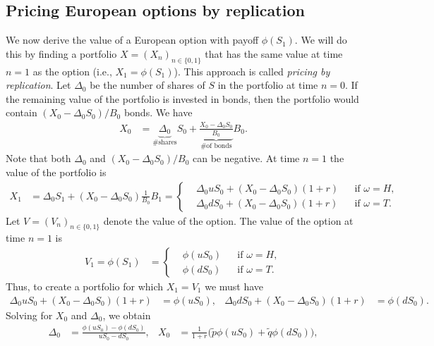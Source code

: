 \documentclass[12pt]{book}
\numberwithin{equation}{chapter}
\theoremstyle{plain}
\numberwithin{theorem}{section}
\theoremstyle{definition}
\numberwithin{exercise}{chapter}
\newcommand{\<}{\langle}
\renewcommand{\>}{\rangle}
\renewcommand{\(}{\left(}
\renewcommand{\)}{\right)}
\renewcommand{\[}{\left[}
\renewcommand{\]}{\right]}
\newcommand\om{\omega}
\newcommand\qt{\widetilde{q}}
\theoremstyle{definition}
\numberwithin{question}{section}
\newcommand\pt{\widetilde{p}}
\begin{document}
\subsection{Pricing European options by replication}
\label{sec:replication}
We now derive the value of a European option with payoff $\phi(S_1)$.
We will do this by finding a portfolio $X = (X_n)_{n \in \{0,1\}}$ that has the same value at time $n=1$ as the option (i.e., $X_1 = \phi(S_1)$). This approach is called \textit{pricing by replication}.
Let $\Delta_0$ be the number of shares of $S$ in the portfolio at time $n=0$. If the remaining value of the portfolio is invested in bonds, then the portfolio would contain $(X_0 - \Delta_0 S_0)/B_0$ bonds.  We have
\begin{align}
X_0
	&= \underbrace{\Delta_0}_{\text{\# shares}} S_0 + \underbrace{\frac{X_0 - \Delta_0 S_0}{B_0}}_{\text{\# of bonds}} B_0.
\end{align}
Note that both $\Delta_0$ and $(X_0 - \Delta_0 S_0)/B_0$ can be negative.
At time $n=1$ the value of the portfolio is
\begin{align}
X_1 
	&= \Delta_0 S_1 + (X_0 - \Delta_0 S_0) \frac{1}{B_0}B_1  =
		\left\{ \begin{aligned}	
			&\Delta_0 u S_0 + (X_0 - \Delta_0 S_0) (1+r) && \text{if $\om = H$}, \\
			&\Delta_0 d S_0 + (X_0 - \Delta_0 S_0) (1+r) && \text{if $\om = T$}.
		\end{aligned} \right.
\end{align}
Let $V = (V_n)_{n \in \{0,1\}}$ denote the value of the option.  The value of the option at time $n=1$ is
\begin{align}
V_1 = \phi(S_1)
	&=
		\left\{ \begin{aligned}	
			&\phi(u S_0) && \text{if $\om = H$}, \\
			&\phi(d S_0) && \text{if $\om = T$}.
		\end{aligned} \right.
\end{align}
Thus, to create a portfolio for which $X_1 = V_1$ we must have
\begin{align} 
\Delta_0 u S_0 + (X_0 - \Delta_0 S_0) (1+r) 
	&=	\phi(u S_0) , &
\Delta_0 d S_0 + (X_0 - \Delta_0 S_0) (1+r) 
	&=	\phi(d S_0) . \label{eq:option_portfolio_equalities}
\end{align}
Solving for $X_0$ and $\Delta_0$, we obtain
\begin{align}
\Delta_0 
	&= \frac{\phi (u S_0) - \phi (d S_0)}{u S_0 - d S_0}, & 
X_0 
	&= \frac{1}{1+r} \big( \pt \phi (u S_0) + \qt \phi (d S_0) \big), \label{eq:portfolio_0}
\end{align}
\end{document}
